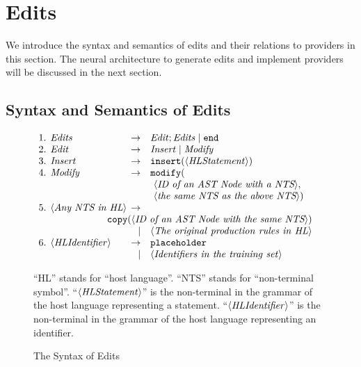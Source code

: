 \section{Edits}
We introduce the syntax and semantics of edits and their relations to providers in this section. The neural architecture to generate edits and implement providers will be discussed in the next section.

\subsection {Syntax and Semantics of Edits}

\begin{figure}
\begin{tcolorbox}
$\begin{array}{rlrl}
1.\hspace{-2mm}&{\it Edits} &\rightarrow & {\it Edit}; {\it Edits} \mid {\tt end}\\
2.\hspace{-2mm}&{\it Edit} &\rightarrow & {\it Insert} \mid {\it Modify}\\
3.\hspace{-2mm}&{\it Insert} &\rightarrow & {\tt insert}({\it \langle HLStatement\rangle}) \\
4.\hspace{-2mm}&{\it Modify} &\rightarrow & {\tt modify}( \\
& & &\  \langle\textit{ID of an AST Node with a NTS}\rangle, \\
& & &\  \langle\textit{the same NTS as the above NTS}\rangle) \\
5.\hspace{-2mm}&{\langle \textit{Any NTS in HL}\rangle }\hspace{-2mm}&\rightarrow \\
&\multicolumn{3}{r} {{\tt copy}(\langle \textit{ID of an\ AST\ Node with the same NTS}\rangle) } \\
&&\mid&{\it \langle The\ original\ production\ rules\ in\ HL\rangle} \\
6.\hspace{-2mm}&{\it \langle HLIdentifier\rangle} \hspace{-2mm}&\rightarrow &{\tt placeholder}\\
&&\mid&{\it \langle Identifiers\ in\ the\ training\ set\rangle} \\
\end{array}$
\end{tcolorbox}    
\parbox{\columnwidth}{\footnotesize ``HL'' stands for ``host language''. ``NTS'' stands for ``non-terminal symbol''. ``${\it \langle HLStatement\rangle}$'' is the non-terminal in the grammar of the host language representing a statement. ``${\it \langle HLIdentifier\rangle}$'' is the non-terminal in the grammar of the host language representing an identifier. }
\vspace{-3mm}
\caption{The Syntax of Edits}
    \vspace{-2mm}
    \label{fig:syntax}
\end{figure}

